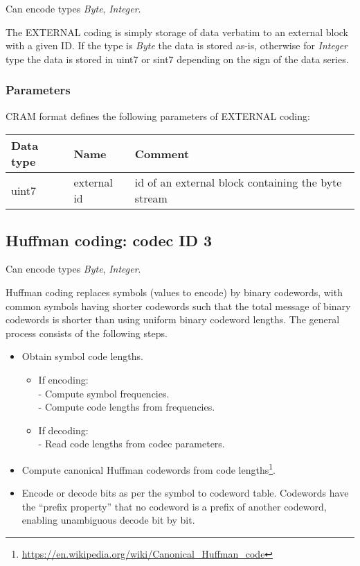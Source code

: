 \documentclass[a4paper]{article}
\begin{document}
Can encode types \textit{Byte}, \textit{Integer}.

The EXTERNAL coding is simply storage of data verbatim to an external block with a given ID.
If the type is \textit{Byte} the data is stored as-is, otherwise for \textit{Integer} type the data is stored in uint7 or sint7 depending on the sign of the data series.

\subsubsection*{Parameters}

CRAM format defines the following parameters of EXTERNAL coding: 

\begin{tabular}{|>{\raggedright}p{100pt}|>{\raggedright}p{100pt}|>{\raggedright}p{230pt}|}
\hline
\textbf{Data type} & \textbf{Name} & \textbf{Comment}
\tabularnewline
\hline
uint7 & external id & id of an external block containing the byte stream\tabularnewline
\hline
\end{tabular}

\subsection{Huffman coding: codec ID 3}

Can encode types \textit{Byte}, \textit{Integer}.

Huffman coding replaces symbols (values to encode) by binary codewords, with common symbols having shorter codewords such that the total message of binary codewords is shorter than using uniform binary codeword lengths.
The general process consists of the following steps.

\begin{itemize}
\item Obtain symbol code lengths.
\begin{itemize}
\item If encoding:\\
- Compute symbol frequencies.\\
- Compute code lengths from frequencies.
\item If decoding:\\
- Read code lengths from codec parameters.
\end{itemize}

\item Compute canonical Huffman codewords from code lengths\footnote{\url{https://en.wikipedia.org/wiki/Canonical_Huffman_code}}.

\item Encode or decode bits as per the symbol to codeword table.
Codewords have the ``prefix property'' that no codeword is a prefix of another codeword, enabling unambiguous decode bit by bit.
\end{itemize}
\end{document}
